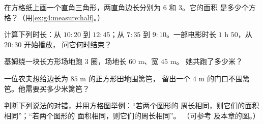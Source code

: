 \begin{exercise}[$\star$]\label{exo:g4:measure:7}
在方格纸上画一个直角三角形，两直角边长分别为 $6$ 和 $3$。它的面积
是多少个方格？（用\cref{ex:g4:measure:half}。）
\end{exercise}

\begin{exercise}[$\star$]\label{exo:g4:measure:8}
计算下列时长：从 $10{:}20$ 到 $12{:}45$；从 $7{:}35$ 到
$9{:}10$。一部电影时长 $1$ h $50$，从 $20{:}30$ 开始播放，
问它何时结束？
\end{exercise}

\begin{exercise}[$\star$]\label{exo:g4:measure:9}
基姆绕一块长方形场地跑 $3$ 圈，场地长 $60$ m、宽 $45$ m。
她共跑了多少米？
\end{exercise}

\begin{exercise}[$\star\star$]\label{exo:g4:measure:10}
一位农夫想给边长为 $85$ m 的正方形田地围篱笆，
留出一个 $4$ m 的门口不围篱笆。他需要买多少米篱笆？
\end{exercise}

\begin{exercise}[$\star\star$]\label{exo:g4:measure:11}
判断下列说法的对错，并用方格图举例：“若两个图形的
周长相同，则它们的面积相同”；“若两个图形的
面积相同，则它们的周长相同”。
（可参考  及本章的图。）
\end{exercise}
